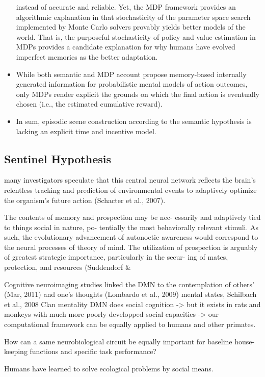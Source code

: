 \documentclass{article} %
\begin{document}
\begin{itemize}
  instead of accurate and reliable.
  Yet, the MDP framework provides an algorithmic explanation in that
  stochasticity of the parameter space search implemented
  by Monte Carlo solvers provably yields better models of the world.
  That is, the purposeful stochasticity of policy and value estimation
  in MDPs provides a candidate explanation for why humans
  have evolved imperfect memories as the better adaptation.
  \item While both semantic and MDP account propose memory-based internally
  generated information for probabilistic mental models of action outcomes,
  only MDPs render explicit the grounds on which the final action is
  eventually chosen (i.e., the estimated cumulative reward).
  \item In sum, episodic scene construction according to the semantic
  hypothesis is lacking an explicit time and incentive model.
\end{itemize}



\subsection{Sentinel Hypothesis}
many investigators speculate that this central neural network reflects the brain’s relentless tracking and prediction of environmental events to adaptively optimize the organism's future action (Schacter et al., 2007).

The contents of memory and prospection may be nec- essarily and adaptively tied to things social in nature, po- tentially the most behaviorally relevant stimuli. As such, the evolutionary advancement of autonoetic awareness would correspond to the neural processes of theory of mind. The utilization of prospection is arguably of greatest strategic importance, particularly in the secur- ing of mates, protection, and resources (Suddendorf \&

Cognitive neuroimaging studies linked the DMN to the contemplation of others’ (Mar, 2011) and one’s thoughts (Lombardo et al., 2009) mental states, 
Schilbach et al., 2008
Clan mentality
DMN does social cognition -> but it exists in rats and monkeys with much more poorly developped social capacities
-> our computational framework can be equally applied to humans
and other primates.

How can a same neurobiological circuit be equally important for baseline house-keeping functions and specific task performance?

Humans have learned to solve ecological problems
by social means.
\end{document}
